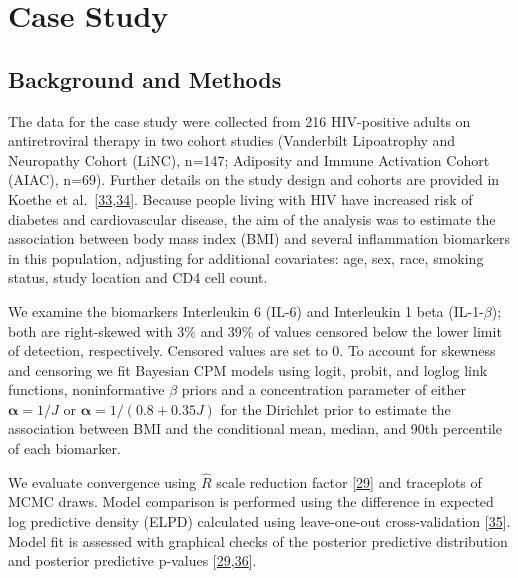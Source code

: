 \documentclass[
]{article}
\begin{document}
\hypertarget{case-study}{%
\section{Case Study}\label{case-study}}

\hypertarget{background-and-methods}{%
\subsection{Background and Methods}\label{background-and-methods}}

The data for the case study were collected from 216 HIV-positive adults on antiretroviral therapy in two cohort studies (Vanderbilt Lipoatrophy and Neuropathy Cohort (LiNC), n=147; Adiposity and Immune Activation Cohort (AIAC), n=69). Further details on the study design and cohorts are provided in Koethe et al.~{{[}\protect\hyperlink{ref-koethe_serum_2012}{33},\protect\hyperlink{ref-koethe_metabolic_2015}{34}{]}}. Because people living with HIV have increased risk of diabetes and cardiovascular disease, the aim of the analysis was to estimate the association between body mass index (BMI) and several inflammation biomarkers in this population, adjusting for additional covariates: age, sex, race, smoking status, study location and CD4 cell count.

We examine the biomarkers Interleukin 6 (IL-6) and Interleukin 1 beta (IL-1-\(\beta\)); both are right-skewed with 3\% and 39\% of values censored below the lower limit of detection, respectively. Censored values are set to 0. To account for skewness and censoring we fit Bayesian CPM models using logit, probit, and loglog link functions, noninformative \(\beta\) priors and a concentration parameter of either \(\boldsymbol{\alpha}=1/J\) or \(\boldsymbol{\alpha}=1/(0.8+0.35J)\) for the Dirichlet prior to estimate the association between BMI and the conditional mean, median, and 90th percentile of each biomarker.

We evaluate convergence using \(\hat{R}\) scale reduction factor {{[}\protect\hyperlink{ref-gelman_bayesian_2014}{29}{]}} and traceplots of MCMC draws. Model comparison is performed using the difference in expected log predictive density (ELPD) calculated using leave-one-out cross-validation {{[}\protect\hyperlink{ref-vehtari_practical_2017}{35}{]}}. Model fit is assessed with graphical checks of the posterior predictive distribution and posterior predictive p-values {{[}\protect\hyperlink{ref-gelman_bayesian_2014}{29},\protect\hyperlink{ref-stern_bayesian_2005}{36}{]}}.
\end{document}
